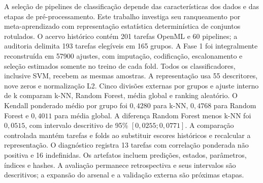 \begin{resumoutfpr}
A seleção de pipelines de classificação depende das características dos dados e das etapas de pré-processamento. Este trabalho investiga seu ranqueamento por meta-aprendizado com representação estatística determinística de conjuntos rotulados. O acervo histórico contém 201 tarefas OpenML e 60 pipelines; a auditoria delimita 193 tarefas elegíveis em 165 grupos. A Fase 1 foi integralmente reconstruída em 57900 ajustes, com imputação, codificação, escalonamento e seleção estimados somente no treino de cada fold. Todos os classificadores, inclusive SVM, recebem as mesmas amostras. A representação usa 55 descritores, nove zeros e normalização L2. Cinco divisões externas por grupos e ajuste interno de k comparam k-NN, Random Forest, média global e ranking aleatório. O Kendall ponderado médio por grupo foi $0{,}4280$ para k-NN, $0{,}4768$ para Random Forest e $0{,}4011$ para média global. A diferença Random Forest menos k-NN foi $0{,}0515$, com intervalo descritivo de 95\% $[0{,}0255;0{,}0771]$. A comparação controlada mantém tarefas e folds ao substituir escores históricos e recalcular a representação. O diagnóstico registra 13 tarefas com correlação ponderada não positiva e 16 indefinidas. Os artefatos incluem predições, estados, parâmetros, índices e hashes. A avaliação permanece retrospectiva e seus intervalos são descritivos; a expansão do arsenal e a validação externa são próximas etapas.
\end{resumoutfpr}
